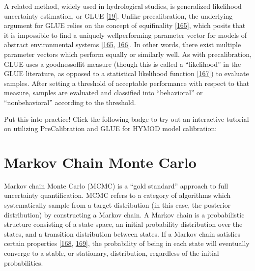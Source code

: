 \documentclass[letterpaper,10pt,english]{sphinxmanual}
\begin{document}
\sphinxAtStartPar
A related method, widely used in hydrological studies, is generalized likelihood uncertainty estimation, or GLUE {[}\hyperlink{cite.index:id38}{19}{]}. Unlike pre\sphinxhyphen{}calibration, the underlying argument for GLUE relies on the concept of equifinality {[}\hyperlink{cite.index:id43}{165}{]}, which posits that it is impossible to find a uniquely well\sphinxhyphen{}performing parameter vector for models of abstract environmental systems {[}\hyperlink{cite.index:id43}{165}, \hyperlink{cite.index:id44}{166}{]}. In other words, there exist multiple parameter vectors which perform equally or similarly well. As with pre\sphinxhyphen{}calibration, GLUE uses a goodness\sphinxhyphen{}of\sphinxhyphen{}fit measure (though this is called a “likelihood” in the GLUE literature, as opposed to a statistical likelihood function {[}\hyperlink{cite.index:id45}{167}{]}) to evaluate samples. After setting a threshold of acceptable performance with respect to that measure, samples are evaluated and classified into “behavioral” or “non\sphinxhyphen{}behavioral” according to the threshold.


\nopagebreak


\sphinxAtStartPar
Put this into practice! Click the following badge to try out an interactive tutorial on utilizing Pre\sphinxhyphen{}Calibration and GLUE for HYMOD model calibration:
\begin{quote}

\sphinxAtStartPar
{}
\end{quote}




\section{Markov Chain Monte Carlo}
\label{\detokenize{A1_Uncertainty_Quantification:markov-chain-monte-carlo}}
\sphinxAtStartPar
Markov chain Monte Carlo (MCMC) is a “gold standard” approach to full uncertainty quantification. MCMC refers to a category of algorithms which systematically sample from a target distribution (in this case, the posterior distribution) by constructing a Markov chain. A Markov chain is a probabilistic structure consisting of a state space, an initial probability distribution over the states, and a transition distribution between states. If a Markov chain satisfies certain properties {[}\hyperlink{cite.index:id170}{168}, \hyperlink{cite.index:id169}{169}{]}, the probability of being in each state will eventually converge to a stable, or stationary, distribution, regardless of the initial probabilities.
\end{document}
